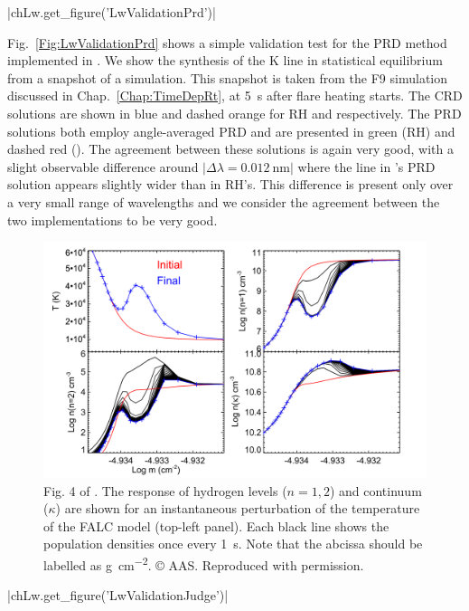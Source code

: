 \py[Lw]|chLw.get_figure('LwValidationPrd')|

Fig.~\ref{Fig:LwValidationPrd} shows a simple validation test for the PRD method implemented in \Lw{}.
We show the synthesis of the \Caii{} K line in statistical equilibrium from a snapshot of a \Radyn{} simulation.
This snapshot is taken from the F9 simulation discussed in Chap.~\ref{Chap:TimeDepRt}, at \SI{5}{\second} after flare heating starts.
The CRD solutions are shown in blue and dashed orange for RH and \Lw{} respectively.
The PRD solutions both employ angle-averaged PRD and are presented in green (RH) and dashed red (\Lw{}).
The agreement between these solutions is again very good, with a slight observable difference around $|\Delta\lambda=\SI{0.012}{\nano\metre}|$ where the line in \Lw{}'s PRD solution appears slightly wider than in RH's.
This difference is present only over a very small range of wavelengths and we consider the agreement between the two implementations to be very good.

\begin{figure}[p]
    \centering
    \includegraphics[width=0.85\columnwidth]{01aFlareModelling/StaticFigs/Judge2017Fig4.png}
    \caption[Fig. 4 of Judge (2017). Time-dependent response of hydrogen populations to instantaneous temperature change.]{Fig. 4 of \citet{Judge2017}. The response of hydrogen levels ($n=1, 2$) and continuum ($\kappa$) are shown for an instantaneous perturbation of the temperature of the FALC model (top-left panel). Each black line shows the population densities once every \SI{1}{\second}. Note that the abcissa should be labelled as \si{\gram\per\square\centi\metre}.
    © AAS. Reproduced with permission.}
    \label{Fig:Judge2017Original}
\end{figure}
\py[Lw]|chLw.get_figure('LwValidationJudge')|

